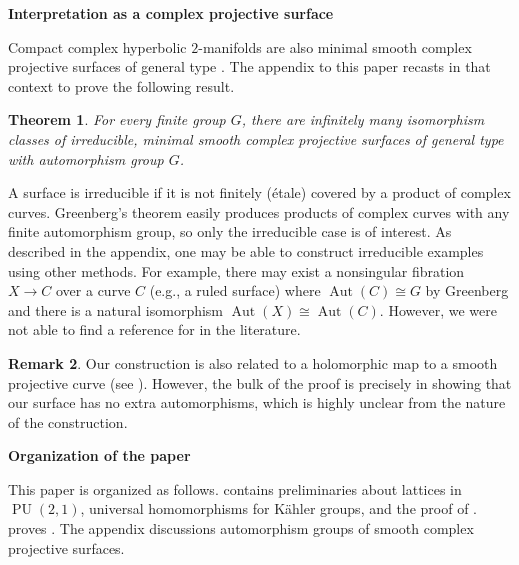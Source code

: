 \documentclass[11pt]{article}
\theoremstyle{plain}
\newtheorem{thm}{Theorem}[section]
\theoremstyle{definition}
\newtheorem{rem}[thm]{Remark}
\theoremstyle{remark}
\DeclareMathOperator{\PU}{PU}
\DeclareMathOperator{\Aut}{Aut}
\begin{document}
\noindent\textbf{Interpretation as a complex projective surface}

\medskip

Compact complex hyperbolic $2$-manifolds are also minimal smooth complex projective surfaces of general type \cite[\S V.20]{BPV}. The appendix to this paper recasts  in that context to prove the following result.

\begin{thm}\label{thm:ProjectiveVersion}
For every finite group $G$, there are infinitely many isomorphism classes of irreducible, minimal smooth complex projective surfaces of general type with automorphism group $G$.
\end{thm}

A surface is irreducible if it is not finitely (\'etale) covered by a product of complex curves. Greenberg's theorem easily produces products of complex curves with any finite automorphism group, so only the irreducible case is of interest. As described in the appendix, one may be able to construct irreducible examples using other methods. For example, there may exist a nonsingular fibration $X \to C$ over a curve $C$ (e.g., a ruled surface) where $\Aut(C) \cong G$ by Greenberg and there is a natural isomorphism $\Aut(X) \cong \Aut(C)$. However, we were not able to find a reference for  in the literature.

\begin{rem}\label{rem:HardPart}
Our construction is also related to a holomorphic map to a smooth projective curve (see ). However, the bulk of the proof is precisely in showing that our surface has no extra automorphisms, which is highly unclear from the nature of the construction.
\end{rem}

\medskip

\noindent\textbf{Organization of the paper}

\medskip

\noindent
This paper is organized as follows.  contains preliminaries about lattices in $\PU(2,1)$, universal homomorphisms for K\"ahler groups, and the proof of .  proves . The appendix discussions automorphism groups of smooth complex projective surfaces.
\end{document}

